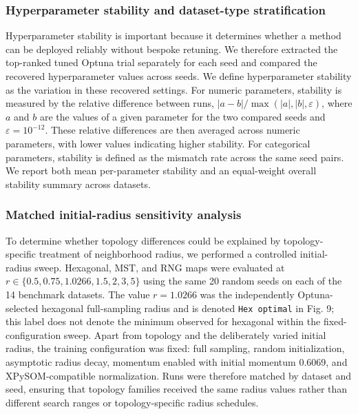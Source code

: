 \documentclass[10pt]{article} %
\begin{document}
\subsubsection{Hyperparameter stability and dataset-type stratification}

Hyperparameter stability is important because it determines whether a method can be deployed reliably without bespoke retuning. We therefore extracted the top-ranked tuned Optuna trial separately for each seed and compared the recovered hyperparameter values across seeds. We define hyperparameter stability as the variation in these recovered settings. For numeric parameters, stability is measured by the relative difference between runs, $|a-b| / \max(|a|,|b|,\varepsilon)$, where $a$ and $b$ are the values of a given parameter for the two compared seeds and $\varepsilon=10^{-12}$. These relative differences are then averaged across numeric parameters, with lower values indicating higher stability. For categorical parameters, stability is defined as the mismatch rate across the same seed pairs. We report both mean per-parameter stability and an equal-weight overall stability summary across datasets.

\subsubsection{Matched initial-radius sensitivity analysis}

To determine whether topology differences could be explained by topology-specific treatment of neighborhood radius, we performed a controlled initial-radius sweep. Hexagonal, MST, and RNG maps were evaluated at $r\in\{0.5,0.75,1.0266,1.5,2,3,5\}$ using the same 20 random seeds on each of the 14 benchmark datasets. The value $r=1.0266$ was the independently Optuna-selected hexagonal full-sampling radius and is denoted \texttt{Hex optimal} in Fig. 9; this label does not denote the minimum observed for hexagonal within the fixed-configuration sweep. Apart from topology and the deliberately varied initial radius, the training configuration was fixed: full sampling, random initialization, asymptotic radius decay, momentum enabled with initial momentum 0.6069, and XPySOM-compatible normalization. Runs were therefore matched by dataset and seed, ensuring that topology families received the same radius values rather than different search ranges or topology-specific radius schedules.
\end{document}
